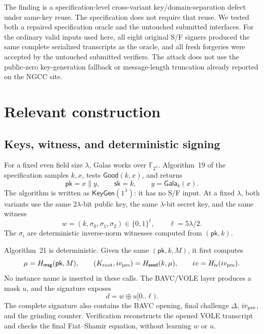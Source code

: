 \documentclass[11pt,a4paper]{article}
\newcommand{\bits}{\{0,1\}}
\newcommand{\xor}{\mathbin{\oplus}}
\newcommand{\KeyGen}{\mathsf{KeyGen}}
\newcommand{\pk}{\mathsf{pk}}
\newcommand{\sk}{\mathsf{sk}}
\newcommand{\Hmsg}{H_{\mathsf{msg}}}
\newcommand{\Hseed}{H_{\mathsf{seed}}}
\newcommand{\Hiv}{H_{\mathsf{iv}}}
\newcommand{\Gala}{\mathsf{Gala}}
\newcommand{\Good}{\mathsf{Good}}
\begin{document}
The finding is a specification-level cross-variant key/domain-separation defect
under same-key reuse.  The specification does not require that reuse.  We tested
both a repaired specification oracle and the untouched submitted interfaces.  For
the ordinary valid inputs used here, all eight original S/F signers produced the
same complete serialized transcripts as the oracle, and all fresh forgeries were
accepted by the untouched submitted verifiers.  The attack does not use the
public-zero key-generation
fallback or message-length truncation already reported on the NGCC site.

\section{Relevant construction}

\subsection{Keys, witness, and deterministic signing}

For a fixed even field size $\lambda$, Galas works over
$\mathbb F_{2^\lambda}$.  Algorithm~19 of the specification samples $k,x$, tests
$\Good(k,x)$, and returns
\begin{equation}
  \pk=x\mathbin\|y,\qquad \sk=k,\qquad y=\Gala_k(x).       \label{eq:keygen}
\end{equation}
The algorithm is written as $\KeyGen(1^\lambda)$: it has no S/F input.  At a
fixed $\lambda$, both variants use the same $2\lambda$-bit public key, the same
$\lambda$-bit secret key, and the same witness
\[
  w=(k,\sigma_0,\sigma_1,\sigma_2)\in\bits^\ell,
  \qquad \ell=5\lambda/2.
\]
The $\sigma_i$ are deterministic inverse-norm witnesses computed from $(\pk,k)$.

Algorithm~21 is deterministic.  Given the same $(\pk,k,M)$, it first computes
\begin{equation}
 \mu=\Hmsg(\pk,M),\qquad
 (K_{\rm root},iv_{\rm pre})=\Hseed(k,\mu),\qquad
 iv=\Hiv(iv_{\rm pre}).                                 \label{eq:state}
\end{equation}
No instance name is inserted in these calls.  The BAVC/VOLE layer produces a
mask $u$, and the signature exposes
\begin{equation}
                   d=w\xor u[0..\ell).                  \label{eq:maskedwitness}
\end{equation}
The complete signature also contains the BAVC opening, final challenge $\Delta$,
$iv_{\rm pre}$, and the grinding counter.  Verification reconstructs the opened
VOLE transcript and checks the final Fiat--Shamir equation, without learning
$w$ or $u$.
\end{document}
